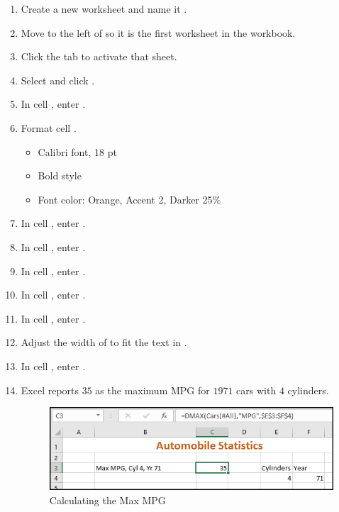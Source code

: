 \begin{enumerate}
	\item Create a new worksheet and name it .
	\item Move  to the left of  so it is the first worksheet in the workbook.
	\item Click the  tab to activate that sheet.
	\item Select  and click .
	\item In cell , enter .
	\item Format cell .
	
	\begin{itemize}
		\item Calibri font, 18 pt
		\item Bold style
		\item Font color: Orange, Accent 2, Darker 25\%
	\end{itemize}
	
	\item In cell , enter .
	\item In cell , enter .
	\item In cell , enter .
	\item In cell , enter .
	
	\item In cell , enter .
	\item Adjust the width of  to fit the text in .
	\item In cell , enter .
	\item Excel reports $ 35 $ as the maximum MPG for $ 1971 $ cars with $ 4 $ cylinders.
	
	\begin{figure}[H]
		\centering
		\includegraphics[width=\maxwidth{.95\linewidth}]{gfx/ch09_fig71}
		\caption{Calculating the Max MPG}
		\label{09:fig71}
	\end{figure}
	

\end{enumerate}
